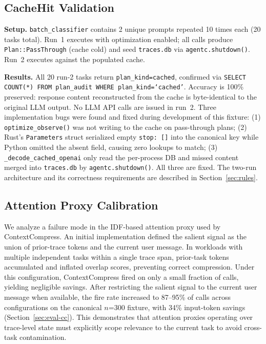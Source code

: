 \subsection{CacheHit Validation}
\label{sec:eval-cachehit}

\textbf{Setup.} \texttt{batch\_classifier} contains 2 unique prompts repeated 10
times each (20 tasks total). Run~1 executes with optimization enabled; all calls
produce \texttt{Plan::PassThrough} (cache cold) and seed \texttt{traces.db} via
\texttt{agentc.shutdown()}. Run~2 executes against the populated cache.

\textbf{Results.} All 20 run-2 tasks return \texttt{plan\_kind=cached}, confirmed
via \texttt{SELECT COUNT(*) FROM plan\_audit WHERE plan\_kind=`cached'}.
Accuracy is 100\% preserved: response content reconstructed from the cache is
byte-identical to the original LLM output. No LLM API calls are issued in run~2.
Three implementation bugs were found and fixed during development of this fixture:
(1) \texttt{optimize\_observe()} was not writing to the cache on pass-through plans;
(2) Rust's \texttt{Parameters} struct serialized empty \texttt{stop:~[]} into the
canonical key while Python omitted the absent field, causing zero lookups to match;
(3) \texttt{\_decode\_cached\_openai} only read the per-process DB and missed content
merged into \texttt{traces.db} by \texttt{agentc.shutdown()}. All three are fixed.
The two-run architecture and its correctness requirements are described in
Section~\ref{sec:rules}.

\subsection{Attention Proxy Calibration}
\label{sec:eval-proxy}

We analyze a failure mode in the IDF-based attention proxy used by ContextCompress.
An initial implementation defined the salient signal as the union of prior-trace
tokens and the current user message. In workloads with multiple independent tasks
within a single trace span, prior-task tokens accumulated and inflated overlap scores,
preventing correct compression. Under this configuration, ContextCompress fired on
only a small fraction of calls, yielding negligible savings. After restricting the
salient signal to the current user message when available, the fire rate increased
to 87--95\% of calls across configurations on the canonical $n$=300 fixture, with
34\% input-token savings (Section~\ref{sec:eval-cc}). This demonstrates that
attention proxies operating over trace-level state must explicitly scope relevance to
the current task to avoid cross-task contamination.

